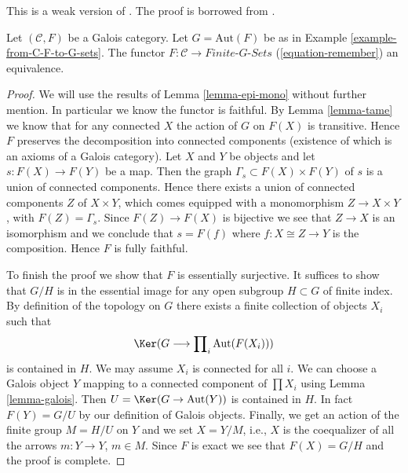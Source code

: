 \begin{proposition}
\label{proposition-galois}
\begin{reference}
This is a weak version of \cite[Expos\'e V]{SGA1}.
The proof is borrowed from \cite[Theorem 7.2.5]{BS}.
\end{reference}
Let $(\mathcal{C}, F)$ be a Galois category. Let $G = \text{Aut}(F)$
be as in Example \ref{example-from-C-F-to-G-sets}. The functor
$F : \mathcal{C} \to \textit{Finite-}G\textit{-Sets}$
(\ref{equation-remember}) an equivalence.
\end{proposition}

\begin{proof}
We will use the results of Lemma \ref{lemma-epi-mono} without further mention.
In particular we know the functor is faithful.
By Lemma \ref{lemma-tame} we know that for any connected $X$ the
action of $G$ on $F(X)$ is transitive. Hence $F$ preserves
the decomposition into connected components (existence of which is
an axioms of a Galois category). Let $X$ and $Y$ be objects and let
$s : F(X) \to F(Y)$ be a map. Then the graph
$\Gamma_s \subset F(X) \times F(Y)$ of $s$
is a union of connected components. Hence there exists a
union of connected components $Z$ of $X \times Y$,
which comes equipped with a monomorphism $Z \to X \times Y$,
with $F(Z) = \Gamma_s$. Since $F(Z) \to F(X)$ is bijective
we see that $Z \to X$ is an isomorphism and we conclude
that $s = F(f)$ where $f : X \cong Z \to Y$ is the composition.
Hence $F$ is fully faithful.

\medskip\noindent
To finish the proof we show that $F$ is essentially surjective.
It suffices to show that $G/H$ is in the essential image for
any open subgroup $H \subset G$ of finite index.
By definition of the topology on $G$ there exists a finite
collection of objects $X_i$ such that
$$
\Ker(G \longrightarrow \prod\nolimits_i \text{Aut}(F(X_i)))
$$
is contained in $H$. We may assume $X_i$ is connected
for all $i$. We can choose a Galois object $Y$ mapping
to a connected component of $\prod X_i$ using
Lemma \ref{lemma-galois}. Then
$U = \Ker(G \to \text{Aut}(Y))$ is contained in $H$.
In fact $F(Y) = G/U$ by our definition of Galois objects.
Finally, we get an action of the finite group $M = H/U$
on $Y$ and we set $X = Y/M$, i.e., $X$ is the coequalizer
of all the arrows $m : Y \to Y$, $m \in M$.
Since $F$ is exact we see that $F(X) = G/H$ and the
proof is complete.
\end{proof}

